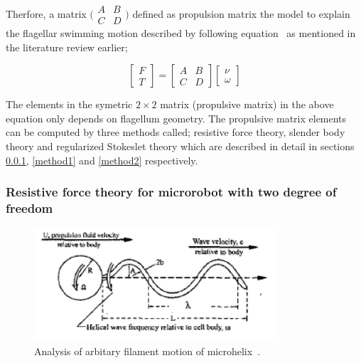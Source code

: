 \documentclass[12pt,a4paper,titlepage]{report}
\begin{document}
 Therfore, a matrix 
$\bigl(\begin{smallmatrix}
A&B\\ C&D
\end{smallmatrix} \bigr)$
 defined as propulsion matrix the
model to explain the flagellar swimming motion described by following equation~\citep{rodenborn2013propulsion}
as mentioned in the literature review earlier;
 

\[
\begin{bmatrix} F\\ 
T\end{bmatrix}  = \begin{bmatrix} A & B \\ 
C & D \end{bmatrix}  \begin{bmatrix} \nu
 \\ \omega
\end{bmatrix}
\]

The elements in the symetric $2\times2$ matrix (propulsive matrix) in the above equation only depends on 
flagellum geometry. The propulsive matrix elements can be computed by three methods called;
resistive force theory, slender body theory and regularized Stokeslet theory which are described in detail in sections \ref{method3}, 
\ref{method1} and \ref{method2} respectively. 


\subsubsection{Resistive force theory for microrobot with two degree of freedom}\label{method3}



\begin{figure}
  \centering
    \includegraphics[width=0.8\textwidth]{motion}
  \caption[Microrobot filament motion]{Analysis of arbitary filament motion of microhelix~\citep{edd2003biomimetic}.}
  \label{motion}
\end{figure}
\end{document}
